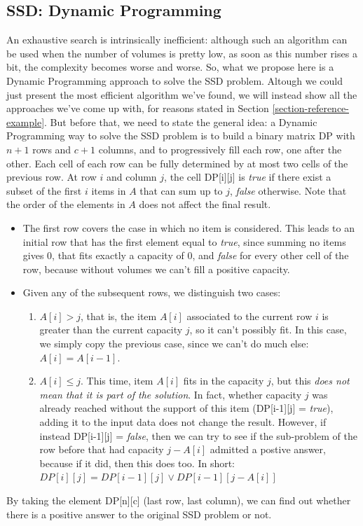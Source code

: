 \documentclass[12pt]{extarticle}
\begin{document}
\subsection{SSD: Dynamic Programming}
An exhaustive search is intrinsically inefficient: although such an algorithm can be used when the number of volumes is pretty low, as soon as this number rises a bit, the complexity becomes worse and worse. So, what we propose here is a Dynamic Programming approach to solve the SSD problem. Altough we could just present the most efficient algorithm we've found, we will instead show all the approaches we've come up with, for reasons stated in Section \ref{section-reference-example}.\newline
But before that, we need to state the general idea: a Dynamic Programming way to solve the SSD problem is to build a binary matrix DP with $n+1$ rows and $c+1$ columns, and to progressively fill each row, one after the other. Each cell of each row can be fully determined by at most two cells of the previous row.\newline
At row $i$ and column $j$, the cell DP[i][j] is \emph{true} if there exist a subset of the first $i$ items in $A$ that can sum up to $j$, \emph{false} otherwise. Note that the order of the elements in $A$ does not affect the final result.\newline
\begin{itemize}
    \item The first row covers the case in which no item is considered. This leads to an initial row that has the first element equal to \emph{true}, since summing no items gives 0, that fits exactly a capacity of 0, and \emph{false} for every other cell of the row, because without volumes we can't fill a positive capacity.
    \item Given any of the subsequent rows, we distinguish two cases:
    \begin{enumerate}
        \item $A[i] > j$, that is, the item $A[i]$ associated to the current row $i$ is greater than the current capacity $j$, so it can't possibly fit. In this case, we simply copy the previous case, since we can't do much else: $A[i] = A[i-1]$.
        \item $A[i] \leq j$. This time, item $A[i]$ fits in the capacity $j$, but this \emph{does not mean that it is part of the solution}. In fact, whether capacity $j$ was already reached without the support of this item (DP[i-1][j] = \emph{true}), adding it to the input data does not change the result. However, if instead DP[i-1][j] = \emph{false}, then we can try to see if the sub-problem of the row before that had capacity $j - A[i]$ admitted a postive answer, because if it did, then this does too. In short:\newline
        $DP[i][j] = DP[i-1][j] \lor DP[i-1][j-A[i]]$
    \end{enumerate}
\end{itemize}
By taking the element DP[n][c] (last row, last column), we can find out whether there is a positive answer to the original SSD problem or not.
\end{document}

